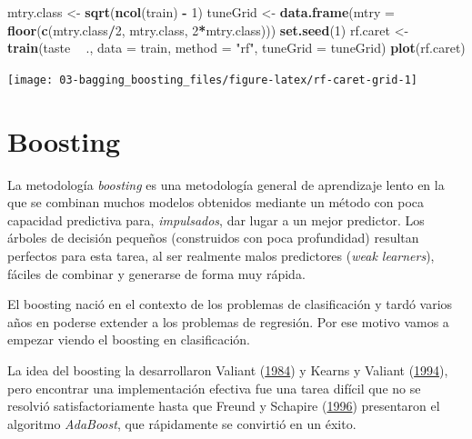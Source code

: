\documentclass[
  spanish,
]{book}
\newenvironment{Shaded}{\begin{snugshade}}{\end{snugshade}}
\newcommand{\DataTypeTok}[1]{\textcolor[rgb]{0.13,0.29,0.53}{#1}}
\newcommand{\DecValTok}[1]{\textcolor[rgb]{0.00,0.00,0.81}{#1}}
\newcommand{\KeywordTok}[1]{\textcolor[rgb]{0.13,0.29,0.53}{\textbf{#1}}}
\newcommand{\NormalTok}[1]{#1}
\newcommand{\OperatorTok}[1]{\textcolor[rgb]{0.81,0.36,0.00}{\textbf{#1}}}
\newcommand{\StringTok}[1]{\textcolor[rgb]{0.31,0.60,0.02}{#1}}
\theoremstyle{break}
\theoremstyle{definition}
\theoremstyle{definition}
\theoremstyle{definition}
\theoremstyle{remark}
\begin{document}
\begin{Shaded}
\begin{Highlighting}[]
\NormalTok{mtry.class <-}\StringTok{ }\KeywordTok{sqrt}\NormalTok{(}\KeywordTok{ncol}\NormalTok{(train) }\OperatorTok{-}\StringTok{ }\DecValTok{1}\NormalTok{)}
\NormalTok{tuneGrid <-}\StringTok{ }\KeywordTok{data.frame}\NormalTok{(}\DataTypeTok{mtry =} \KeywordTok{floor}\NormalTok{(}\KeywordTok{c}\NormalTok{(mtry.class}\OperatorTok{/}\DecValTok{2}\NormalTok{, mtry.class, }\DecValTok{2}\OperatorTok{*}\NormalTok{mtry.class)))}
\KeywordTok{set.seed}\NormalTok{(}\DecValTok{1}\NormalTok{)}
\NormalTok{rf.caret <-}\StringTok{ }\KeywordTok{train}\NormalTok{(taste }\OperatorTok{~}\StringTok{ }\NormalTok{., }\DataTypeTok{data =}\NormalTok{ train,}
                  \DataTypeTok{method =} \StringTok{"rf"}\NormalTok{, }\DataTypeTok{tuneGrid =}\NormalTok{ tuneGrid)}
\KeywordTok{plot}\NormalTok{(rf.caret)}
\end{Highlighting}
\end{Shaded}

\begin{center}\texttt{[image: 03-bagging\_boosting\_files/figure-latex/rf-caret-grid-1]} \end{center}

\hypertarget{boosting}{%
\section{Boosting}\label{boosting}}

La metodología \emph{boosting} es una metodología general de aprendizaje lento en la que se combinan muchos modelos obtenidos mediante un método con poca capacidad predictiva para, \emph{impulsados}, dar lugar a un mejor predictor. Los árboles de decisión pequeños (construidos con poca profundidad) resultan perfectos para esta tarea, al ser realmente malos predictores (\emph{weak learners}), fáciles de combinar y generarse de forma muy rápida.

El boosting nació en el contexto de los problemas de clasificación y tardó varios años en poderse extender a los problemas de regresión. Por ese motivo vamos a empezar viendo el boosting en clasificación.

La idea del boosting la desarrollaron Valiant (\protect\hyperlink{ref-valiant1984theory}{1984}) y Kearns y Valiant (\protect\hyperlink{ref-kearns_cryptographic_1994}{1994}), pero encontrar una implementación efectiva fue una tarea difícil que no se resolvió satisfactoriamente hasta que Freund y Schapire (\protect\hyperlink{ref-freund1996schapire}{1996}) presentaron el algoritmo \emph{AdaBoost}, que rápidamente se convirtió en un éxito.
\end{document}
